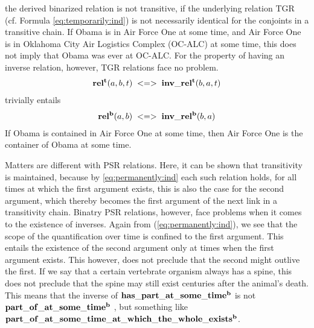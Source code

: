 %
the derived binarized relation is not transitive, if the underlying relation TGR (cf. Formula \ref{eq:temporarily:ind}) is 
not necessarily identical for the conjoints in a transitive chain. If Obama is in Air Force One at some time, 
and Air Force One is in Oklahoma City Air Logistics Complex (OC-ALC) at some time, this does not imply that Obama 
was ever at OC-ALC. For the property of having an inverse relation, however, TGR relations face no problem.  
% 
\begin{equation}
\begin{split}
\mathrm{\mathbf{rel^t}}(a,b,t) \; <=> \; \mathrm{\mathbf{inv\_rel^t}}(b,a,t)  
\end{split}
\label{eq:trinv}
\end{equation}    
%
trivially entails
%
\begin{equation}
\begin{split}
\mathrm{\mathbf{rel^b}}(a,b) \; <=> \; \mathrm{\mathbf{inv\_rel^b}}(b,a)  
\end{split}
\label{eq:trinv2}
\end{equation}    
%
If Obama is contained in Air Force One at some time, then Air Force One is the container of Obama at some time.

Matters are different with PSR relations. Here, it can be shown that transitivity is maintained, because by \ref{eq:permanently:ind} each such relation holds, 
for all times at which the first argument exists, this is also the case for the second argument, which thereby becomes the first argument of the next link in a transitivity chain.
Binatry PSR relations, however, face problems when it comes to the existence of inverses. 
Again from (\ref{eq:permanently:ind}), we see that the scope of the quantification over time is confined to the first argument. This entails the existence of the second argument only at times when the first argument exists. This however, does not preclude that the second might outlive the first. If we say that a certain vertebrate organism always has a spine, this does not preclude that the spine may still exist centuries after the animal's death.    
This means that the inverse of $\mathrm{\mathbf{has\_part\_at\_some\_time^b}}$ is not $\mathrm{\mathbf{part\_of\_at\_some\_time^b}}$ \todo{}, but something like $\mathrm{\mathbf{part\_of
\_at\_some\_time\_at\_which\_the\_whole\_exists^b}}$.  

